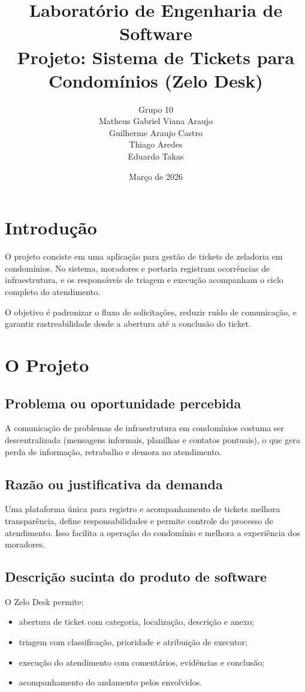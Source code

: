\documentclass[12pt,a4paper]{article}
\title{Laboratório de Engenharia de Software\\Projeto: Sistema de Tickets para Condomínios (Zelo Desk)}
\author{Grupo 10\\Matheus Gabriel Viana Araujo\\Guilherme Araujo Castro\\Thiago Aredes\\Eduardo Takas}
\date{Março de 2026}
\begin{document}
\maketitle
\tableofcontents
\newpage

\section{Introdução}

O projeto consiste em uma aplicação para gestão de tickets de zeladoria em condomínios.
No sistema, moradores e portaria registram ocorrências de infraestrutura,
e os responsáveis de triagem e execução acompanham o ciclo completo do atendimento.

O objetivo é padronizar o fluxo de solicitações, reduzir ruído de comunicação,
e garantir rastreabilidade desde a abertura até a conclusão do ticket.

\section{O Projeto}

\subsection{Problema ou oportunidade percebida}

A comunicação de problemas de infraestrutura em condomínios costuma ser descentralizada
(mensagens informais, planilhas e contatos pontuais),
o que gera perda de informação, retrabalho e demora no atendimento.

\subsection{Razão ou justificativa da demanda}

Uma plataforma única para registro e acompanhamento de tickets melhora transparência,
define responsabilidades e permite controle do processo de atendimento.
Isso facilita a operação do condomínio e melhora a experiência dos moradores.

\subsection{Descrição sucinta do produto de software}

O Zelo Desk permite:
\begin{itemize}
    \item abertura de ticket com categoria, localização, descrição e anexo;
    \item triagem com classificação, prioridade e atribuição de executor;
    \item execução do atendimento com comentários, evidências e conclusão;
    \item acompanhamento do andamento pelos envolvidos.
\end{itemize}
\end{document}
